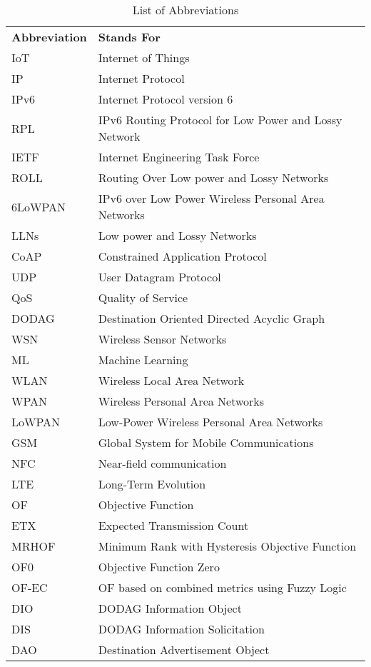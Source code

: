 \documentclass[10pt,journal,sort & compress]{IEEEtran}
\begin{document}
              
\begin{table}[]
	\centering
	\caption{List of Abbreviations}
	\label{LOA}
	\begin{tabular}{ll}
		\textbf{Abbreviation} & \textbf{Stands For} \\
		IoT & Internet of Things \\
		IP & Internet Protocol \\
		IPv6 & Internet Protocol version 6 \\
		RPL & IPv6 Routing Protocol for Low Power and Lossy Network \\
		IETF & Internet Engineering Task Force \\
		ROLL & Routing Over Low power and Lossy Networks \\
		6LoWPAN & IPv6 over Low Power Wireless Personal Area Networks \\
		LLNs & Low power and Lossy Networks \\
		CoAP & Constrained Application Protocol \\
		UDP & User Datagram Protocol \\
		QoS & Quality of Service \\
		DODAG & Destination Oriented Directed Acyclic Graph \\
		WSN & Wireless Sensor Networks \\
		ML & Machine Learning \\
		WLAN & Wireless Local Area Network \\
		WPAN & Wireless Personal Area Networks \\
		LoWPAN & Low-Power Wireless Personal Area Networks \\
		GSM & Global System for Mobile Communications \\
		NFC & Near-field communication \\
		LTE & Long-Term Evolution \\
		OF & Objective Function \\
		ETX & Expected Transmission Count \\
		MRHOF & Minimum Rank with Hysteresis Objective Function \\
		OF0 & Objective Function Zero \\
		OF-EC & OF based on combined metrics using Fuzzy Logic \\
		DIO & DODAG Information Object \\
		DIS & DODAG Information Solicitation \\
		DAO & Destination Advertisement Object \\

\end{tabular}
\end{table}
\end{document}
